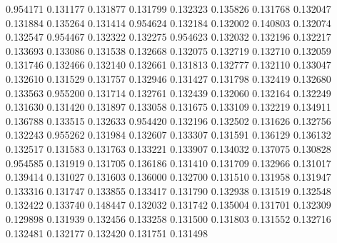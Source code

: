 0.954171
0.131177
0.131877
0.131799
0.132323
0.135826
0.131768
0.132047
0.131884
0.135264
0.131414
0.954624
0.132184
0.132002
0.140803
0.132074
0.132547
0.954467
0.132322
0.132275
0.954623
0.132032
0.132196
0.132217
0.133693
0.133086
0.131538
0.132668
0.132075
0.132719
0.132710
0.132059
0.131746
0.132466
0.132140
0.132661
0.131813
0.132777
0.132110
0.133047
0.132610
0.131529
0.131757
0.132946
0.131427
0.131798
0.132419
0.132680
0.133563
0.955200
0.131714
0.132761
0.132439
0.132060
0.132164
0.132249
0.131630
0.131420
0.131897
0.133058
0.131675
0.133109
0.132219
0.134911
0.136788
0.133515
0.132633
0.954420
0.132196
0.132502
0.131626
0.132756
0.132243
0.955262
0.131984
0.132607
0.133307
0.131591
0.136129
0.136132
0.132517
0.131583
0.131763
0.133221
0.133907
0.134032
0.137075
0.130828
0.954585
0.131919
0.131705
0.136186
0.131410
0.131709
0.132966
0.131017
0.139414
0.131027
0.131603
0.136000
0.132700
0.131510
0.131958
0.131947
0.133316
0.131747
0.133855
0.133417
0.131790
0.132938
0.131519
0.132548
0.132422
0.133740
0.148447
0.132032
0.131742
0.135004
0.131701
0.132309
0.129898
0.131939
0.132456
0.133258
0.131500
0.131803
0.131552
0.132716
0.132481
0.132177
0.132420
0.131751
0.131498
